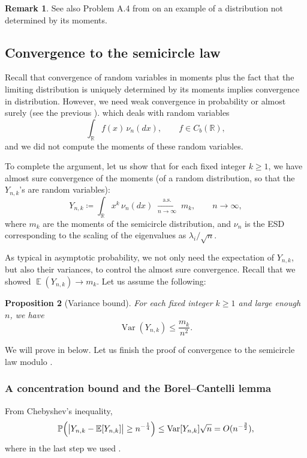 \documentclass[letterpaper,11pt,oneside,reqno]{book}
\numberwithin{equation}{chapter}  %
\newtheorem{proposition}{Proposition}[chapter]  %
\theoremstyle{definition}
\newtheorem{remark}[proposition]{Remark}
\begin{document}
\begin{remark}
	See also Problem A.4 from  on an example of a distribution not determined by its moments.
\end{remark}

\subsection{Convergence to the semicircle law}

Recall
\cite[Theorem~30.2]{billingsley1995probability}
that convergence
of random variables
in moments plus the fact that the
limiting distribution is uniquely determined by its moments
implies convergence in distribution.
However, we need weak convergence in probability or almost surely (see the
previous ).
which deals with random variables
\begin{equation*}
\int_{\mathbb{R}} f(x) \, \nu_n(dx),\qquad f\in C_b(\mathbb{R}),
\end{equation*}
and we did not compute the moments of these random variables.

To complete the argument, let us show that for each fixed integer \(k\ge1\),
we have almost sure convergence of the moments (of a
random distribution, so that the $Y_{n,k}$'s are random variables):
\[
Y_{n,k}\coloneqq\int_{\mathbb{R}}x^k\,\nu_n(dx)
  \;\xrightarrow[n\to\infty]{\text{a.s.}}\;
	m_{k},
	\qquad n\to\infty,
\]
where $m_k$ are the moments of the semicircle distribution,
and $\nu_n$ is the ESD corresponding to the scaling of the
eigenvalues as $\lambda_i/\sqrt n$.

As typical in asymptotic probability, we not only need the
expectation of $Y_{n,k}$, but also their variances,
to control the almost sure convergence.
Recall that
we showed $\operatorname{\mathbb{E}}(Y_{n,k})\to m_k$.
Let us assume the following:
\begin{proposition}[Variance bound]
	\label{lecture2:prop:variance-bound}
	For each fixed integer \(k\ge1\) and large enough \(n\),
	we have
	\begin{equation*}
	\operatorname{\mathrm{Var}}(Y_{n,k})\le \frac{m_k}{n^2}.
	\end{equation*}
\end{proposition}
We will prove  in 
below.
Let us finish the proof of convergence to the semicircle law modulo .


\subsubsection{A concentration bound and the Borel--Cantelli lemma}
From Chebyshev's inequality,
\[
  \mathbb{P}\Bigl(\bigl|Y_{n,k} - \mathbb{E}[Y_{n,k}]\bigr|
	\ge n^{-\frac{1}{4}}\Bigr)
  \le
  \operatorname{\mathrm{Var}}[Y_{n,k}]\sqrt{n}
	=O(n^{-\frac{3}{2}}),
\]
where in the last step we used .
\end{document}
